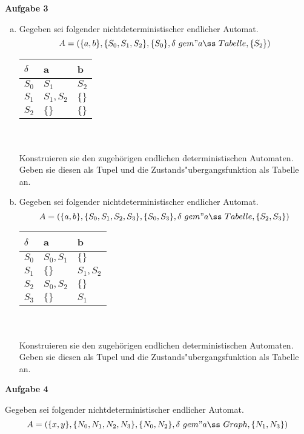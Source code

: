 \documentclass[a4paper,12pt]{article}
\newcommand{\Aufgabe}[1]{
  {
  \vspace*{0.5cm}
  \textsf{\textbf{Aufgabe #1}}
  \vspace*{0.2cm}
  
  }
}
\begin{document}
\Aufgabe{3}
\begin{enumerate}[a)]
\item
Gegeben sei folgender nichtdeterministischer endlicher Automat.
$$ A = (\{a,b\},\{S_0,S_1,S_2\}, \{S_0\}, \delta \ gem"aß \ Tabelle, \{S_2\})$$


\begin{tabular}{l|l|l}
$\delta$ & a & b  \\
\hline
$S_0$ & $S_1$ & $S_2$ \\
\hline
$S_1$ & $S_1,S_2$ & $\{ \}$ \\
\hline
$S_2$ & $\{ \}$& $\{ \}$ \\
\end{tabular}
\\
\\
Konstruieren sie den zugehörigen endlichen deterministischen Automaten.
Geben sie diesen als Tupel und die Zustands"ubergangsfunktion als Tabelle an.

\item
Gegeben sei folgender nichtdeterministischer endlicher Automat.
$$ A = (\{a,b\},\{S_0,S_1,S_2,S_3\}, \{S_0,S_3\}, \delta \ gem"aß \ Tabelle, \{S_2,S_3\})$$


\begin{tabular}{l|l|l}
$\delta$ & a & b  \\
\hline
$S_0$ & $S_0, S_1$ & $\{ \}$ \\
\hline
$S_1$ & $\{ \}$ & $S_1,S_2$ \\
\hline
$S_2$ & $S_0, S_2$& $\{ \}$ \\
\hline
$S_3$ & $\{ \}$& $S_1$ \\
\end{tabular}
\\
\\
Konstruieren sie den zugehörigen endlichen deterministischen Automaten.
Geben sie diesen als Tupel und die Zustands"ubergangsfunktion als Tabelle an.
\end{enumerate}


\Aufgabe{4}
Gegeben sei folgender nichtdeterministischer endlicher Automat.
$$ A = (\{x,y\},\{N_0,N_1,N_2,N_3\}, \{N_0,N_2\}, \delta \ gem"aß \ Graph, \{N_1,N_3\})$$


\end{document}
